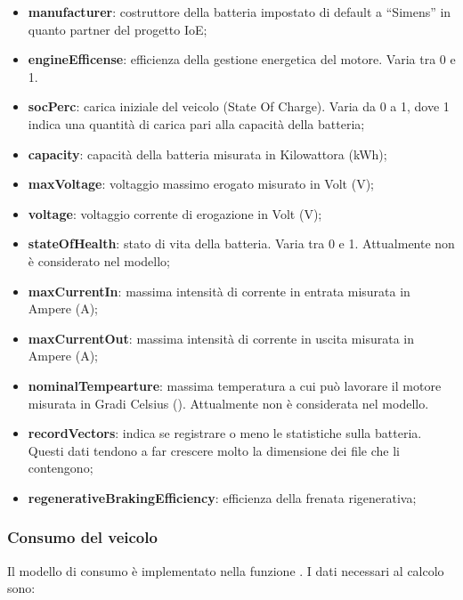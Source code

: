 \begin{itemize}
	\item \textbf{manufacturer}: costruttore della batteria impostato di default a ``Simens'' in quanto partner del progetto IoE;
	\item \textbf{engineEfficense}: efficienza della gestione energetica del motore. Varia tra 0 e 1.
	\item \textbf{socPerc}: carica iniziale del veicolo (State Of Charge). Varia da 0 a 1, dove 1 indica una quantità di carica pari alla capacità della batteria;
    \item \textbf{capacity}: capacità della batteria misurata in Kilowattora (kWh);
    \item \textbf{maxVoltage}: voltaggio massimo erogato misurato in Volt (V);
    \item \textbf{voltage}: voltaggio corrente di erogazione in Volt (V);
    \item \textbf{stateOfHealth}: stato di vita della batteria. Varia tra 0 e 1. Attualmente non è considerato nel modello;
    \item \textbf{maxCurrentIn}: massima intensità di corrente in entrata misurata in Ampere (A);
    \item \textbf{maxCurrentOut}: massima intensità di corrente in uscita misurata in Ampere (A);
    \item \textbf{nominalTempearture}: massima temperatura a cui può lavorare il motore misurata in Gradi Celsius (\textcelsius). Attualmente non è considerata nel modello.
    \item \textbf{recordVectors}: indica se registrare o meno le statistiche sulla batteria. Questi dati tendono a far crescere molto la dimensione dei file che li contengono;
    \item \textbf{regenerativeBrakingEfficiency}: efficienza della frenata rigenerativa;
\end{itemize}

\subsubsection{Consumo del veicolo}

Il modello di consumo è implementato nella funzione . I dati necessari al calcolo sono: 

